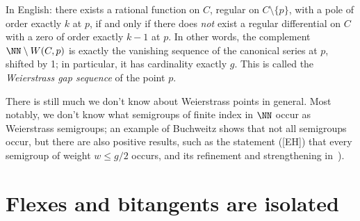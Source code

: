 In English: there exists a rational function on $C$, regular on $C \setminus \{p\}$, with a pole of order exactly $k$ at $p$, if and only if there does \emph{not} exist a regular differential on $C$ with a zero of order exactly $k-1$ at $p$.
 In other words, the complement $\NN \setminus W(C,p)$ is exactly the vanishing sequence of the canonical series at $p$, shifted by 1; in particular, it has cardinality  exactly $g$. This is called the \emph{Weierstrass gap sequence} of the point $p$.

%
%

There is still much we don't know about Weierstrass points in general. Most notably, we don't know what semigroups of finite index in $\NN$ occur as Weierstrass semigroups; an example of Buchweitz shows that not all semigroups occur, but there are also positive results, such as the statement ([EH]) that every semigroup of weight $w \leq g/2$ occurs, and its refinement and strengthening in~\cite{MR3892968}).


\section{Flexes and bitangents are isolated}\label{isolated flexes and bitangents}

